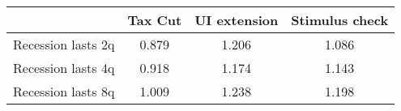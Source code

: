 \begin{tabular}{@{}lccc@{}} 
\toprule 
& Tax Cut    & UI extension    & Stimulus check    \\  \midrule 
Recession lasts 2q &0.879  & 1.206  & 1.086     \\ 
Recession lasts 4q &0.918  & 1.174  & 1.143     \\ 
Recession lasts 8q &1.009  & 1.238  & 1.198     \\ 
\end{tabular}  

